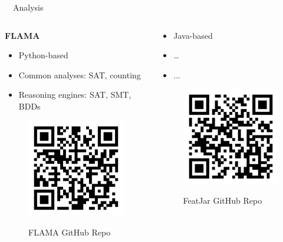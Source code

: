 \documentclass[
	aspectratio=169, %
	8pt, %
	nosectionframes, %
]{beamer}
\newcommand{\inlinesubtitle}[1]{\textcolor{gray!60}{~{}~#1}}
\begin{document}
\begin{frame}{\insertsection \inlinesubtitle{Analysis}}
    \vspace{0.4cm}
    \begin{columns}[t]
		\begin{column}{0.49\textwidth}
			\textbf{FLAMA}
            \begin{itemize}
                \item Python-based
                \item Common analyses: SAT, counting
                \item Reasoning engines: SAT, SMT, BDDs
            \end{itemize}
            \begin{figure}
                \centering
                \includegraphics[width=0.5\columnwidth]{pics/qr/flama.pdf}
                
                FLAMA GitHub Repo
            \end{figure}
		\end{column}%
		\begin{column}{0.49\textwidth}
            \begin{itemize}
                \item Java-based
                \item \dots
                \item ...
            \end{itemize}
            \begin{figure}
                \centering
                \includegraphics[width=0.5\columnwidth]{pics/qr/featjar.pdf}
                
                FeatJar GitHub Repo
            \end{figure}
		\end{column}
	\end{columns}
\end{frame}
\end{document}
